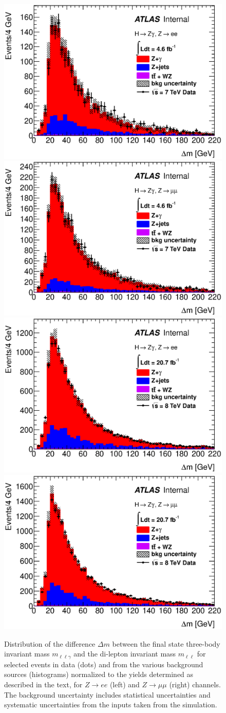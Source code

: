 \begin{figure}[!htbp]
  \begin{center}
    \includegraphics[width=0.49\columnwidth]{figures/bkg_decomposition_2011_e_dMllg_Z_PV_corr_linscale}
    \includegraphics[width=0.49\columnwidth]{figures/bkg_decomposition_2011_mu_dMllg_Z_PV_corr_linscale}
    \includegraphics[width=0.49\columnwidth]{figures/bkg_decomposition_2012_e_dMllg_Z_PV_corr_linscale}
    \includegraphics[width=0.49\columnwidth]{figures/bkg_decomposition_2012_mu_dMllg_Z_PV_corr_linscale}
    \caption{Distribution of the difference $\Delta m$ 
      between the final state three-body invariant mass
      $m_{\ell\ell\gamma}$ and the di-lepton invariant mass
      $m_{\ell\ell}$ for selected events in data (dots) and from
      the various background sources (histograms) normalized to the yields determined 
      as described in the text, for $Z\to ee$ (left) and $Z\to\mu\mu$ (right) channels.
      The background uncertainty includes statistical uncertainties and systematic
      uncertainties from the inputs taken from the simulation.
    }
    \label{fig:Dm_mass_linear}
  \end{center}
\end{figure}
